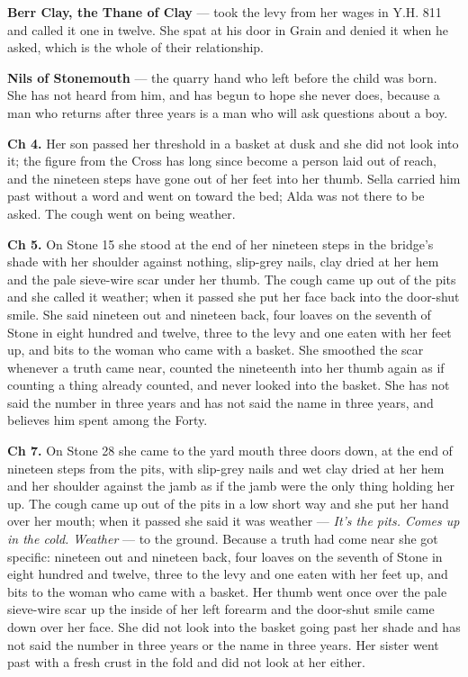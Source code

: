 \documentclass{design/chronicle}
\begin{document}
{\textbf{Berr Clay, the Thane of Clay} — took the levy from her wages in Y.H. 811 and called it one in twelve. She spat at his door in Grain and denied it when he asked, which is the whole of their relationship.

\textbf{Nils of Stonemouth} — the quarry hand who left before the child was born. She has not heard from him, and has begun to hope she never does, because a man who returns after three years is a man who will ask questions about a boy.

\textbf{Ch 4.} Her son passed her threshold in a basket at dusk and she did not look into it; the figure from the Cross has long since become a person laid out of reach, and the nineteen steps have gone out of her feet into her thumb. Sella carried him past without a word and went on toward the bed; Alda was not there to be asked. The cough went on being weather.

\textbf{Ch 5.} On Stone 15 she stood at the end of her nineteen steps in the bridge’s shade with her shoulder against nothing, slip-grey nails, clay dried at her hem and the pale sieve-wire scar under her thumb. The cough came up out of the pits and she called it weather; when it passed she put her face back into the door-shut smile. She said nineteen out and nineteen back, four loaves on the seventh of Stone in eight hundred and twelve, three to the levy and one eaten with her feet up, and bits to the woman who came with a basket. She smoothed the scar whenever a truth came near, counted the nineteenth into her thumb again as if counting a thing already counted, and never looked into the basket. She has not said the number in three years and has not said the name in three years, and believes him spent among the Forty.

\textbf{Ch 7.} On Stone 28 she came to the yard mouth three doors down, at the end of nineteen steps from the pits, with slip-grey nails and wet clay dried at her hem and her shoulder against the jamb as if the jamb were the only thing holding her up. The cough came up out of the pits in a low short way and she put her hand over her mouth; when it passed she said it was weather --- \emph{It’s the pits. Comes up in the cold. Weather} --- to the ground. Because a truth had come near she got specific: nineteen out and nineteen back, four loaves on the seventh of Stone in eight hundred and twelve, three to the levy and one eaten with her feet up, and bits to the woman who came with a basket. Her thumb went once over the pale sieve-wire scar up the inside of her left forearm and the door-shut smile came down over her face. She did not look into the basket going past her shade and has not said the number in three years or the name in three years. Her sister went past with a fresh crust in the fold and did not look at her either.

}
\end{document}
